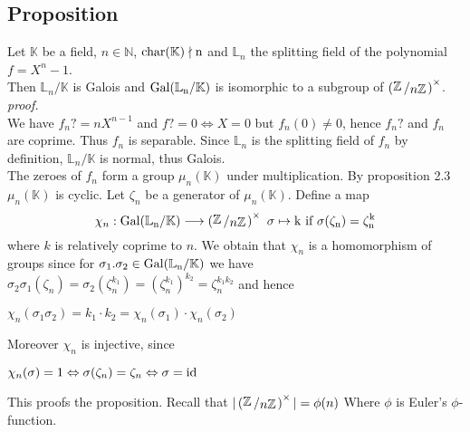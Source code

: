 \documentclass[12pt]{book}
\newcommand{\slant}[2]{{\raisebox{.1em}{$#1$}\left/\raisebox{-.1em}{$#2$}\right.}}
\begin{document}
\begin{spacing}{1.3}
\subsection{Proposition } %
\titleformat{\subsection}{\normalfont\normalsize\bfseries}{}{0em}{#1 \thesubsection}
Let $\mathbb{K}$ be a field, $n \in \mathbb{N}$, $\rm{char}(\mathbb{K}) \nmid n$ and $\mathbb{L}_n$ the splitting field of the polynomial $f=X^n-1$.\\
Then $\mathbb{L}_n/\mathbb{K}$ is Galois and $\rm{Gal}(\mathbb{L}_n/\mathbb{K})$ is isomorphic to a subgroup of $\left(\slant{\mathbb{Z}}{n \mathbb{Z}}\right)^{\times}$.\\
\textit{proof.}\\
We have $f_n?=n X^{n-1}$ and $f?=0 \Leftrightarrow X=0$ but $f_n(0)\neq 0$, hence $f_n?$ and $f_n$ are coprime. Thus $f_n$ is separable. Since $\mathbb{L}_n$ is the splitting field of $f_n$ by definition, $\mathbb{L}_n/\mathbb{K}$ is normal, thus Galois.\\
The zeroes of $f_n$ form a group $\mu_n(\mathbb{K})$ under multiplication. By proposition 2.3 $\mu_n(\mathbb{K})$ is cyclic. Let $\zeta_n$ be a generator of $\mu_n(\mathbb{K})$. Define a map
$$ \chi_n: \rm{Gal}(\mathbb{L}_n/\mathbb{K}) \longrightarrow \left(\slant{\mathbb{Z}}{n \mathbb{Z}}\right)^{\times}\textrm{ }\sigma \mapsto k\textrm{ if }\sigma(\zeta_n)=\zeta_n^k$$
where $k$ is relatively coprime to $n$. We obtain that $\chi_n$ is a homomorphism of groups since for $\sigma_1. \sigma_2 \in \rm{Gal}(\mathbb{L}_n/\mathbb{K})$ we have $ \sigma_2 \sigma_1(\zeta_n)=\sigma_2 \left(\zeta_n^{k_1}\right)=\left(\zeta_n^{k_1}\right)^{k_2}=\zeta_n^{k_1 k_2}$
and hence 
\begin{center}$ \chi_n \left( \sigma_1 \sigma_2 \right)=k_1 \cdot k_2 = \chi_n(\sigma_1) \cdot \chi_n(\sigma_2)$\end{center}
Moreover $\chi_n$ is injective, since
\begin{center}$ \chi_n(\sigma)=1 \Leftrightarrow \sigma(\zeta_n)= \zeta_n \Leftrightarrow \sigma= \rm{id}$\end{center}
This proofs the proposition. Recall that $\vert \left( \slant{\mathbb{Z}}{n \mathbb{Z}}\right)^{\times} \vert = \phi(n)$ Where $\phi$ is Euler's $\phi$-function.
\newpage


\renewcommand*\thesection{§ \arabic{section}\quad}

\end{spacing}
\end{document}
